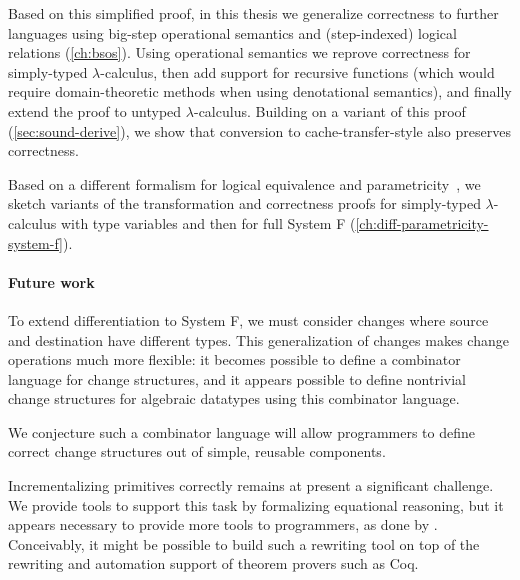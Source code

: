 Based on this simplified proof, in this thesis we generalize correctness to
further languages
using big-step operational semantics and (step-indexed) logical relations (\cref{ch:bsos}).
Using operational semantics we reprove correctness for simply-typed
$\lambda$-calculus, then add support for recursive functions (which would
require domain-theoretic methods when using denotational semantics), and finally
extend the proof to untyped $\lambda$-calculus. Building on a variant of this
proof (\cref{sec:sound-derive}), we show that conversion to cache-transfer-style
also preserves correctness.

Based on a different formalism for logical equivalence and
parametricity~\citep{Bernardy2011realizability}, we sketch variants of the
transformation and correctness proofs for simply-typed $\lambda$-calculus with
type variables and then for full System F (\cref{ch:diff-parametricity-system-f}).

\paragraph{Future work}
\label{ch:incr-conclusion-futwork}
To extend differentiation to System F, we must consider changes where source and
destination have different types. This generalization of changes makes change
operations much more flexible: it becomes possible to define a combinator
language for change structures, and it appears possible to define nontrivial
change structures for algebraic datatypes using this combinator language.

We conjecture such a combinator language will allow programmers to define
correct change structures out of simple, reusable components.

Incrementalizing primitives correctly remains at present a significant
challenge. We provide tools to support this task by formalizing equational
reasoning, but it appears necessary to provide more tools to programmers, as
done by \citet{Liu00}. Conceivably, it might be possible to build such a
rewriting tool on top of the rewriting and automation support of theorem provers
such as Coq.


